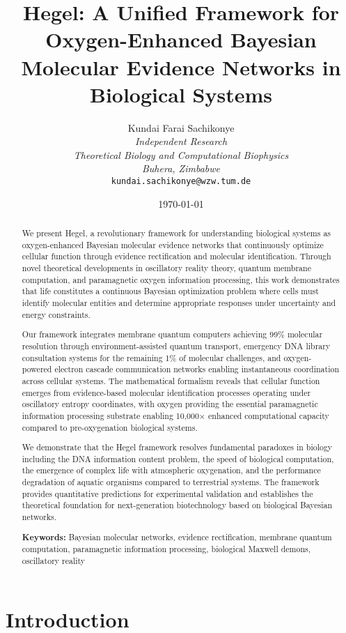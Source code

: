 \documentclass[12pt,a4paper]{article}
\title{\textbf{Hegel: A Unified Framework for Oxygen-Enhanced Bayesian Molecular Evidence Networks in Biological Systems}}
\author{
Kundai Farai Sachikonye\\
\textit{Independent Research}\\
\textit{Theoretical Biology and Computational Biophysics}\\
\textit{Buhera, Zimbabwe}\\
\texttt{kundai.sachikonye@wzw.tum.de}
}
\date{\today}
\begin{document}
\maketitle

\begin{abstract}
We present Hegel, a revolutionary framework for understanding biological systems as oxygen-enhanced Bayesian molecular evidence networks that continuously optimize cellular function through evidence rectification and molecular identification. Through novel theoretical developments in oscillatory reality theory, quantum membrane computation, and paramagnetic oxygen information processing, this work demonstrates that life constitutes a continuous Bayesian optimization problem where cells must identify molecular entities and determine appropriate responses under uncertainty and energy constraints.

Our framework integrates membrane quantum computers achieving 99\% molecular resolution through environment-assisted quantum transport, emergency DNA library consultation systems for the remaining 1\% of molecular challenges, and oxygen-powered electron cascade communication networks enabling instantaneous coordination across cellular systems. The mathematical formalism reveals that cellular function emerges from evidence-based molecular identification processes operating under oscillatory entropy coordinates, with oxygen providing the essential paramagnetic information processing substrate enabling 10,000× enhanced computational capacity compared to pre-oxygenation biological systems.

We demonstrate that the Hegel framework resolves fundamental paradoxes in biology including the DNA information content problem, the speed of biological computation, the emergence of complex life with atmospheric oxygenation, and the performance degradation of aquatic organisms compared to terrestrial systems. The framework provides quantitative predictions for experimental validation and establishes the theoretical foundation for next-generation biotechnology based on biological Bayesian networks.

\textbf{Keywords:} Bayesian molecular networks, evidence rectification, membrane quantum computation, paramagnetic information processing, biological Maxwell demons, oscillatory reality
\end{abstract}

\section{Introduction}
\end{document}

